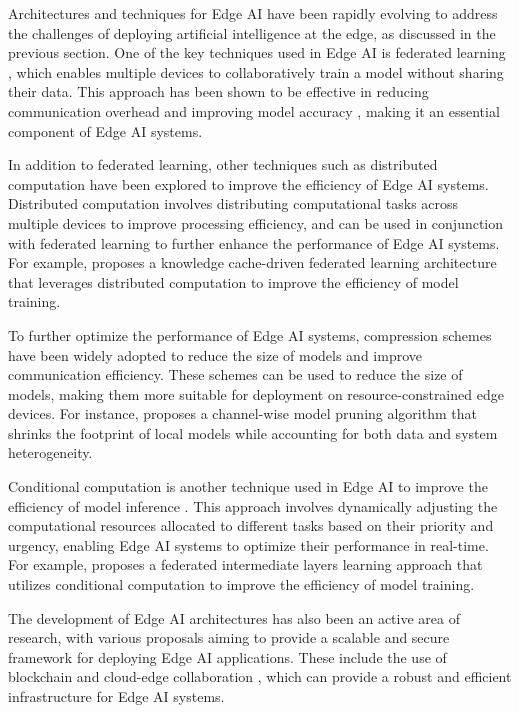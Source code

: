 \documentclass[11pt]{article}
\begin{document}
Architectures and techniques for Edge AI have been rapidly evolving to address the challenges of deploying artificial intelligence at the edge, as discussed in the previous section. One of the key techniques used in Edge AI is federated learning \cite{ref176,ref177}, which enables multiple devices to collaboratively train a model without sharing their data. This approach has been shown to be effective in reducing communication overhead and improving model accuracy \cite{ref116,ref178}, making it an essential component of Edge AI systems.

In addition to federated learning, other techniques such as distributed computation \cite{ref179,ref180} have been explored to improve the efficiency of Edge AI systems. Distributed computation involves distributing computational tasks across multiple devices to improve processing efficiency, and can be used in conjunction with federated learning to further enhance the performance of Edge AI systems. For example, \cite{ref181} proposes a knowledge cache-driven federated learning architecture that leverages distributed computation to improve the efficiency of model training.

To further optimize the performance of Edge AI systems, compression schemes \cite{ref182,ref183} have been widely adopted to reduce the size of models and improve communication efficiency. These schemes can be used to reduce the size of models, making them more suitable for deployment on resource-constrained edge devices. For instance, \cite{ref177} proposes a channel-wise model pruning algorithm that shrinks the footprint of local models while accounting for both data and system heterogeneity.

Conditional computation is another technique used in Edge AI to improve the efficiency of model inference \cite{ref184,ref185}. This approach involves dynamically adjusting the computational resources allocated to different tasks based on their priority and urgency, enabling Edge AI systems to optimize their performance in real-time. For example, \cite{ref186} proposes a federated intermediate layers learning approach that utilizes conditional computation to improve the efficiency of model training.

The development of Edge AI architectures has also been an active area of research, with various proposals aiming to provide a scalable and secure framework for deploying Edge AI applications. These include the use of blockchain \cite{ref116,ref187} and cloud-edge collaboration \cite{ref188,ref189}, which can provide a robust and efficient infrastructure for Edge AI systems.
\end{document}
